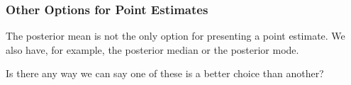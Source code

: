 \documentclass{beamer}
\begin{document}
\begin{frame}
\frametitle{Other Options for Point Estimates}
The posterior mean is not the only option for presenting a point estimate.
We also have, for example, the posterior median or the posterior mode.\\[0.5em]\pause

Is there any way we can say one of these is a better choice than another?

\end{frame}
\end{document}
